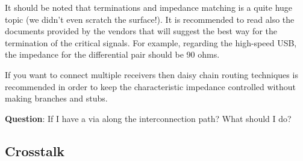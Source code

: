 \documentclass[12pt]{article}
\begin{document}
It should be noted that terminations and impedance matching is a quite huge topic (we didn't even scratch the surface!). It is recommended to read also the documents provided by the vendors that will suggest the best way for the termination of the critical signals. For example, regarding the high-speed USB, the impedance for the differential pair should be 90 ohms.






If you want to connect multiple receivers then daisy chain routing techniques is recommended in order to keep the characteristic impedance controlled without making branches and stubs.

\textbf{Question}: If I have a via along the interconnection path? What should I do?

\subsection{Crosstalk}



\end{document}
